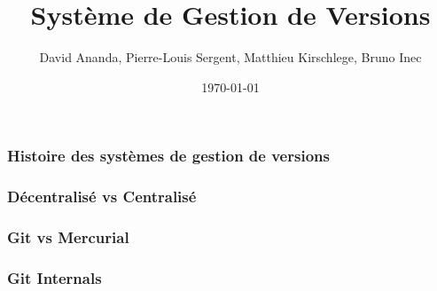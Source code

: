 \documentclass{beamer}
\title{Système de Gestion de Versions}
\date{\today}
\author{David Ananda, Pierre-Louis Sergent, Matthieu Kirschlege, Bruno Inec}
\institute{IUT informatique Lyon1}
\begin{document}
  \maketitle
  \begin{frame}
    \frametitle{Histoire des systèmes de gestion de versions}

  \end{frame}
  \begin{frame}
    \frametitle{Décentralisé vs Centralisé}

  \end{frame}
  \begin{frame}
    \frametitle{Git vs Mercurial}

  \end{frame}
  \begin{frame}
    \frametitle{Git Internals}

  \end{frame}
\end{document}
